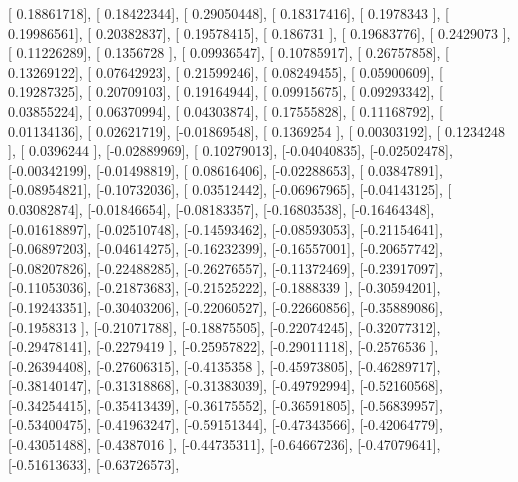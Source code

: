 \documentclass{article}
\begin{document}
       [ 0.18861718],
       [ 0.18422344],
       [ 0.29050448],
       [ 0.18317416],
       [ 0.1978343 ],
       [ 0.19986561],
       [ 0.20382837],
       [ 0.19578415],
       [ 0.186731  ],
       [ 0.19683776],
       [ 0.2429073 ],
       [ 0.11226289],
       [ 0.1356728 ],
       [ 0.09936547],
       [ 0.10785917],
       [ 0.26757858],
       [ 0.13269122],
       [ 0.07642923],
       [ 0.21599246],
       [ 0.08249455],
       [ 0.05900609],
       [ 0.19287325],
       [ 0.20709103],
       [ 0.19164944],
       [ 0.09915675],
       [ 0.09293342],
       [ 0.03855224],
       [ 0.06370994],
       [ 0.04303874],
       [ 0.17555828],
       [ 0.11168792],
       [ 0.01134136],
       [ 0.02621719],
       [-0.01869548],
       [ 0.1369254 ],
       [ 0.00303192],
       [ 0.1234248 ],
       [ 0.0396244 ],
       [-0.02889969],
       [ 0.10279013],
       [-0.04040835],
       [-0.02502478],
       [-0.00342199],
       [-0.01498819],
       [ 0.08616406],
       [-0.02288653],
       [ 0.03847891],
       [-0.08954821],
       [-0.10732036],
       [ 0.03512442],
       [-0.06967965],
       [-0.04143125],
       [ 0.03082874],
       [-0.01846654],
       [-0.08183357],
       [-0.16803538],
       [-0.16464348],
       [-0.01618897],
       [-0.02510748],
       [-0.14593462],
       [-0.08593053],
       [-0.21154641],
       [-0.06897203],
       [-0.04614275],
       [-0.16232399],
       [-0.16557001],
       [-0.20657742],
       [-0.08207826],
       [-0.22488285],
       [-0.26276557],
       [-0.11372469],
       [-0.23917097],
       [-0.11053036],
       [-0.21873683],
       [-0.21525222],
       [-0.1888339 ],
       [-0.30594201],
       [-0.19243351],
       [-0.30403206],
       [-0.22060527],
       [-0.22660856],
       [-0.35889086],
       [-0.1958313 ],
       [-0.21071788],
       [-0.18875505],
       [-0.22074245],
       [-0.32077312],
       [-0.29478141],
       [-0.2279419 ],
       [-0.25957822],
       [-0.29011118],
       [-0.2576536 ],
       [-0.26394408],
       [-0.27606315],
       [-0.4135358 ],
       [-0.45973805],
       [-0.46289717],
       [-0.38140147],
       [-0.31318868],
       [-0.31383039],
       [-0.49792994],
       [-0.52160568],
       [-0.34254415],
       [-0.35413439],
       [-0.36175552],
       [-0.36591805],
       [-0.56839957],
       [-0.53400475],
       [-0.41963247],
       [-0.59151344],
       [-0.47343566],
       [-0.42064779],
       [-0.43051488],
       [-0.4387016 ],
       [-0.44735311],
       [-0.64667236],
       [-0.47079641],
       [-0.51613633],
       [-0.63726573],
\end{document}
